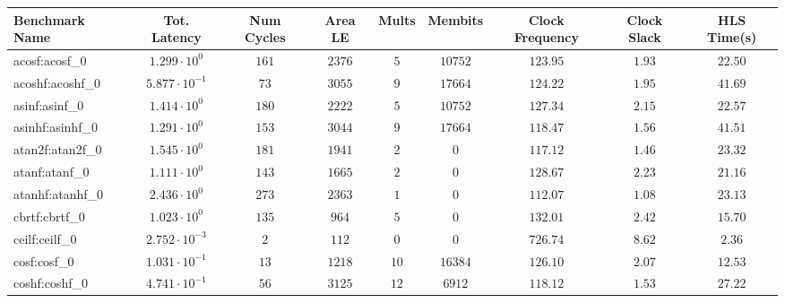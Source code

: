 \begin{tabular}{|l|c|c|c|c|c|c|c|c|}
\hline
Benchmark Name               & Tot. Latency            & Num Cycles & Area LE   & Mults   & Membits    & Clock Frequency & Clock Slack & HLS Time(s) \\
\hline
acosf:acosf\_0               & $ 1.299 \cdot 10^{0}  $ & $ 161    $ & $ 2376  $ & $ 5   $ & $ 10752  $ & $ 123.95      $ & $ 1.93    $ & $ 22.50   $ \\
acoshf:acoshf\_0             & $ 5.877 \cdot 10^{-1} $ & $ 73     $ & $ 3055  $ & $ 9   $ & $ 17664  $ & $ 124.22      $ & $ 1.95    $ & $ 41.69   $ \\
asinf:asinf\_0               & $ 1.414 \cdot 10^{0}  $ & $ 180    $ & $ 2222  $ & $ 5   $ & $ 10752  $ & $ 127.34      $ & $ 2.15    $ & $ 22.57   $ \\
asinhf:asinhf\_0             & $ 1.291 \cdot 10^{0}  $ & $ 153    $ & $ 3044  $ & $ 9   $ & $ 17664  $ & $ 118.47      $ & $ 1.56    $ & $ 41.51   $ \\
atan2f:atan2f\_0             & $ 1.545 \cdot 10^{0}  $ & $ 181    $ & $ 1941  $ & $ 2   $ & $ 0      $ & $ 117.12      $ & $ 1.46    $ & $ 23.32   $ \\
atanf:atanf\_0               & $ 1.111 \cdot 10^{0}  $ & $ 143    $ & $ 1665  $ & $ 2   $ & $ 0      $ & $ 128.67      $ & $ 2.23    $ & $ 21.16   $ \\
atanhf:atanhf\_0             & $ 2.436 \cdot 10^{0}  $ & $ 273    $ & $ 2363  $ & $ 1   $ & $ 0      $ & $ 112.07      $ & $ 1.08    $ & $ 23.13   $ \\
cbrtf:cbrtf\_0               & $ 1.023 \cdot 10^{0}  $ & $ 135    $ & $ 964   $ & $ 5   $ & $ 0      $ & $ 132.01      $ & $ 2.42    $ & $ 15.70   $ \\
ceilf:ceilf\_0               & $ 2.752 \cdot 10^{-3} $ & $ 2      $ & $ 112   $ & $ 0   $ & $ 0      $ & $ 726.74      $ & $ 8.62    $ & $ 2.36    $ \\
cosf:cosf\_0                 & $ 1.031 \cdot 10^{-1} $ & $ 13     $ & $ 1218  $ & $ 10  $ & $ 16384  $ & $ 126.10      $ & $ 2.07    $ & $ 12.53   $ \\
coshf:coshf\_0               & $ 4.741 \cdot 10^{-1} $ & $ 56     $ & $ 3125  $ & $ 12  $ & $ 6912   $ & $ 118.12      $ & $ 1.53    $ & $ 27.22   $ \\

\end{tabular}
